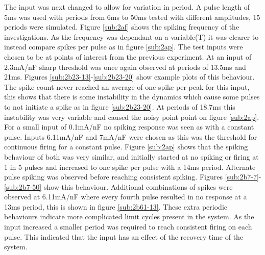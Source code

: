 \documentclass[twoside,twocolumn]{article}
\begin{document}
The input was next changed to allow for variation in period. A pulse length of 5ms was used with periods from 6ms to 50ms tested with different amplitudes, 15 periods were simulated. Figure \ref{sub:2af} shows the spiking frequency of the investigations. As the frequency was dependant on a variable(T) it was clearer to instead compare spikes per pulse as in figure \ref{sub:2ap}. The test inputs were chosen to be at points of interest from the previous experiment.
\newline
 At an input of 2.3mA/nF sharp threshold was once again observed at periods of 13.5ms and 21ms. Figures \ref{sub:2b23-13}-\ref{sub:2b23-20} show example plots of this behaviour. The spike count never reached an average of one spike per peak for this input, this shows that there is some instability in the dynamics which cause some pulses to not initiate a spike as in figure \ref{sub:2b23-20}. At periods of 18.7ms this instability was very variable and caused the noisy point point on figure \ref{sub:2ap}.
\newline
For a small input of 0.1mA/nF no spiking response was seen as with a constant pulse. Inputs 6.11mA/nF and 7mA/nF were chosen as this was the threshold for continuous firing for a constant pulse. Figure \ref{sub:2ap} shows that the spiking behaviour of both was very similar, and initially started at no spiking or firing at 1 in 5 pulses and increased to one spike per pulse with a 14ms period. Alternate pulse spiking was observed before reaching consistent spiking. Figures \ref{sub:2b7-7}-\ref{sub:2b7-50} show this behaviour. Additional combinations of spikes were observed at 6.11mA/nF where every fourth pulse resulted in no response at a 13ms period, this is shown in figure \ref{sub:2b61-13}. These extra periodic behaviours indicate more complicated limit cycles present in the system.
\newline
As the input increased a smaller period was required to reach consistent firing on each pulse. This indicated that the input has an effect of the recovery time of the system.






\onecolumn
\end{document}
